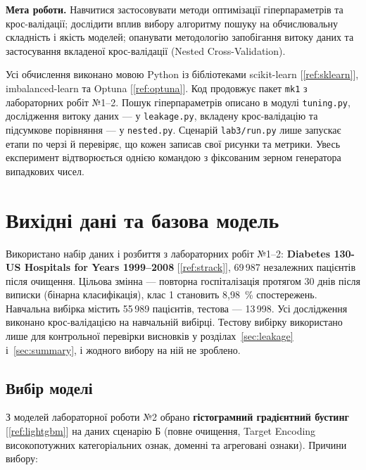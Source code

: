 \documentclass[14pt,a4paper]{extreport}
\begin{document}

\textbf{Мета роботи.} Навчитися застосовувати методи оптимізації гіперпараметрів та крос-валідації; дослідити вплив вибору алгоритму пошуку на обчислювальну складність і якість моделей; опанувати методологію запобігання витоку даних та застосування вкладеної крос-валідації (Nested Cross-Validation).

Усі обчислення виконано мовою Python із бібліотеками scikit-learn [\ref{ref:sklearn}], imbalanced-learn та Optuna [\ref{ref:optuna}]. Код продовжує пакет \texttt{mk1} з лабораторних робіт №1--2. Пошук гіперпараметрів описано в модулі \texttt{tuning.py}, дослідження витоку даних --- у \texttt{leakage.py}, вкладену крос-валідацію та підсумкове порівняння --- у \texttt{nested.py}. Сценарій \texttt{lab3/run.py} лише запускає етапи по черзі й перевіряє, що кожен записав свої рисунки та метрики. Увесь експеримент відтворюється однією командою з фіксованим зерном генератора випадкових чисел.

\section{Вихідні дані та базова модель}
\label{sec:data}

Використано набір даних і розбиття з лабораторних робіт №1--2: \textbf{Diabetes 130-US Hospitals for Years 1999--2008} [\ref{ref:strack}], 69\,987 незалежних пацієнтів після очищення. Цільова змінна --- повторна госпіталізація протягом 30 днів після виписки (бінарна класифікація), клас 1 становить 8,98~\% спостережень. Навчальна вибірка містить 55\,989 пацієнтів, тестова --- 13\,998. Усі дослідження виконано крос-валідацією на навчальній вибірці. Тестову вибірку використано лише для контрольної перевірки висновків у розділах~\ref{sec:leakage} і~\ref{sec:summary}, і жодного вибору на ній не зроблено.

\subsection{Вибір моделі}

З моделей лабораторної роботи №2 обрано \textbf{гістограмний градієнтний бустинг} [\ref{ref:lightgbm}] на даних сценарію Б (повне очищення, Target Encoding високопотужних категоріальних ознак, доменні та агреговані ознаки). Причини вибору:
\end{document}
